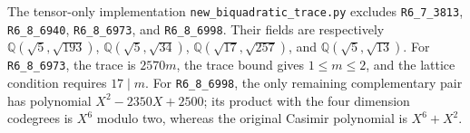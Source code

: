 The tensor-only implementation \texttt{new\_biquadratic\_trace.py} excludes
\texttt{R6\_7\_3813}, \texttt{R6\_8\_6940}, \texttt{R6\_8\_6973}, and
\texttt{R6\_8\_6998}.  Their fields are respectively
$\mathbb Q(\sqrt5,\sqrt{193})$,
$\mathbb Q(\sqrt5,\sqrt{34})$,
$\mathbb Q(\sqrt{17},\sqrt{257})$, and
$\mathbb Q(\sqrt5,\sqrt{13})$.
For \texttt{R6\_8\_6973}, the trace is $2570m$, the trace bound gives
$1\le m\le2$, and the lattice condition requires $17\mid m$.
For \texttt{R6\_8\_6998}, the only remaining complementary pair has polynomial
$X^2-2350X+2500$; its product with the four dimension codegrees is
$X^6$ modulo two, whereas the original Casimir polynomial is $X^6+X^2$.
